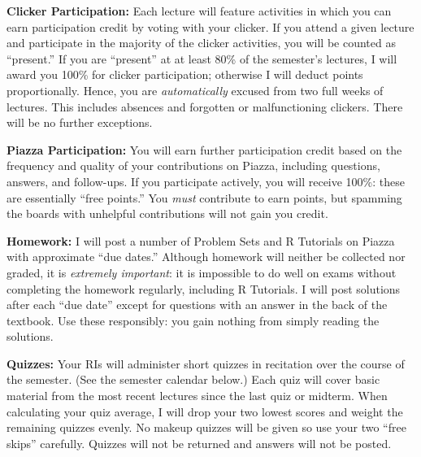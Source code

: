 \documentclass[11pt, letterpaper]{article}
\begin{document}
\noindent \textbf{Clicker Participation:} Each lecture will feature activities in which you can earn participation credit by voting with your clicker. If you attend a given lecture and participate in the majority of the clicker activities, you will be counted as ``present.'' If you are ``present'' at at least 80\% of the semester's lectures, I will award you 100\% for clicker participation; otherwise I will deduct points proportionally. Hence, you are \emph{automatically} excused from two full weeks of lectures. This includes absences and forgotten or malfunctioning clickers. There will be no further exceptions.


\medskip

\noindent \textbf{Piazza Participation:} You will earn further participation credit based on the frequency and quality of your contributions on Piazza, including questions, answers, and follow-ups. If you participate actively, you will receive 100\%: these are essentially ``free points.''  You \emph{must} contribute to earn points, but spamming the boards with unhelpful contributions will not gain you credit.  


\medskip



\noindent \textbf{Homework:} I will post a number of Problem Sets and R Tutorials on Piazza with approximate ``due dates.'' Although homework will neither be collected nor graded, it is \emph{extremely important}: it is impossible to do well on exams without completing the homework regularly, including R Tutorials. I will post solutions after each ``due date'' except for questions with an answer in the back of the textbook. Use these responsibly: you gain nothing from simply reading the solutions.


 \medskip

\noindent \textbf{Quizzes:} Your RIs will administer  short quizzes in recitation over the course of the semester. (See the semester calendar below.) Each quiz will cover basic material from the most recent lectures since the last quiz or midterm. When calculating your quiz average, I will drop your two lowest scores and weight the remaining quizzes evenly. No makeup quizzes will be given so use your two ``free skips'' carefully. Quizzes will not be returned and answers will not be posted.

\medskip
\end{document}
